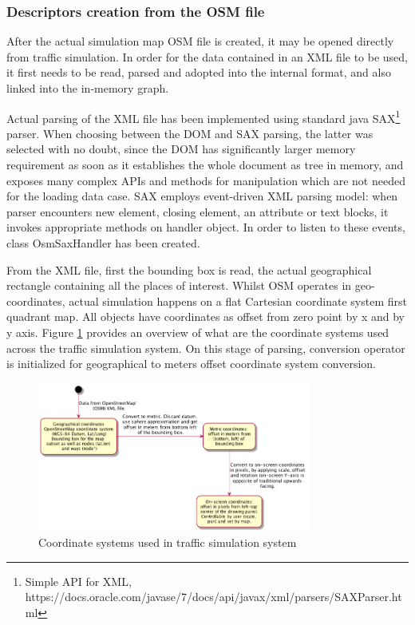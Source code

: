 \subsubsection{Descriptors creation from the OSM file}
After the actual simulation map OSM file is created, it may be opened directly from traffic simulation. In order for the data contained in an XML file to be used, it first needs to be read, parsed and adopted into the internal format, and also linked into the in-memory graph.

Actual parsing of the XML file has been implemented using standard java SAX\footnote{Simple API for XML, https://docs.oracle.com/javase/7/docs/api/javax/xml/parsers/SAXParser.html} parser. When choosing between the DOM and SAX parsing, the latter was selected with no doubt, since the DOM has significantly larger memory requirement as soon as it establishes the whole document as tree in memory, and exposes many complex APIs and methods for manipulation which are not needed for the loading data case. SAX employs event-driven XML parsing model: when parser encounters new element, closing element, an attribute or text blocks, it invokes appropriate methods on handler object. In order to listen to these events, class OsmSaxHandler has been created.

From the XML file, first the bounding box is read, the actual geographical rectangle containing all the places of interest. Whilst OSM operates in geo-coordinates, actual simulation happens on a flat Cartesian coordinate system first quadrant map. All objects have coordinates as offset from zero point by x and by y axis. Figure \ref{fig:coordinateConversions} provides an overview of what are the coordinate systems used across the traffic simulation system. On this stage of parsing, conversion operator is initialized for geographical to meters offset coordinate system conversion.

\begin{figure}[h]
    \caption{Coordinate systems used in traffic simulation system}
    \label{fig:coordinateConversions}
    \centering
    \includegraphics[width=0.8\textwidth]{../../uml_diagrams/coordinateSystems.png}
\end{figure}

